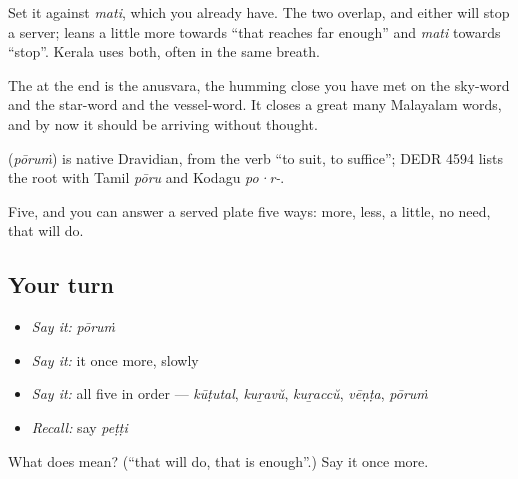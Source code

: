 Set it against \emph{mati}, which you already have. The two overlap, and either will stop a server;  leans a little more towards \textquotedblleft{}that reaches far enough\textquotedblright{} and \emph{mati} towards \textquotedblleft{}stop\textquotedblright{}. Kerala uses both, often in the same breath.

The  at the end is the anusvara, the humming close you have met on the sky-word and the star-word and the vessel-word. It closes a great many Malayalam words, and by now it should be arriving without thought.

\begin{cousinweb}
\textbf{} (\emph{pōruṁ}) is native Dravidian, from the verb \textquotedblleft{}to suit, to suffice\textquotedblright{}; DEDR 4594 lists the root with Tamil \emph{pōru} and Kodagu \emph{po·r-}.
\end{cousinweb}

\begin{grammarlens}[title={What you've built}]
Five, and you can answer a served plate five ways: more, less, a little, no need, that will do.
\end{grammarlens}

\subsection*{Your turn}
\begin{itemize}
\raggedright
  \item \emph{Say it:} \emph{pōruṁ}
  \item \emph{Say it:} it once more, slowly
  \item \emph{Say it:} all five in order — \emph{kūṭutal}, \emph{kuṟavŭ}, \emph{kuṟaccŭ}, \emph{vēṇṭa}, \emph{pōruṁ}
  \item \emph{Recall:} say \emph{peṭṭi}
\end{itemize}

\begin{tcolorbox}[breakable,colback=teal!4,colframe=teal!35!black,title={Before you move on}]
What does  mean? (\textquotedblleft{}that will do, that is enough\textquotedblright{}.) Say it once more.
\end{tcolorbox}
